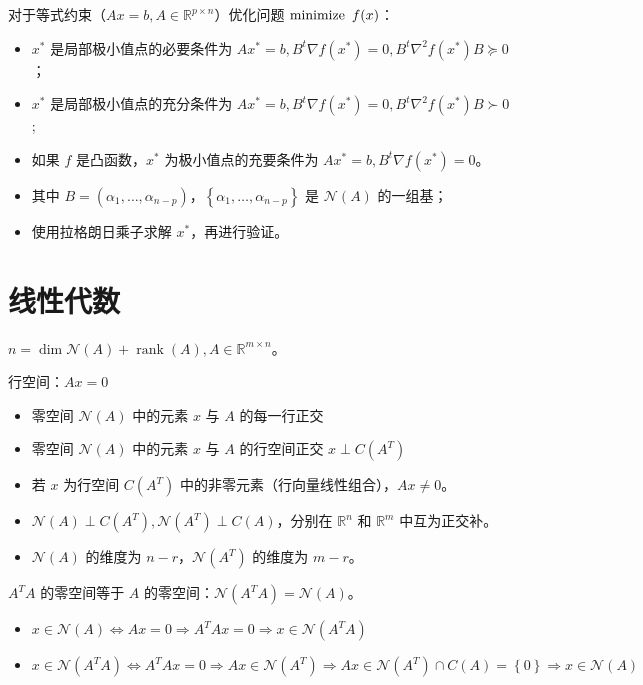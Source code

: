 \begin{remark}
	对于等式约束（$Ax=b, A\in \mathbb{R}^{p\times n}$）优化问题 $\operatorname{minimize}\ f(x)$：
	\begin{itemize}
		\item $x^*$ 是局部极小值点的必要条件为 $Ax^*=b, B^t\nabla f(x^*) = 0, B^t\nabla^2f(x^*)B \succeq 0$；
		\item $x^*$ 是局部极小值点的充分条件为 $Ax^*=b, B^t\nabla f(x^*) = 0, B^t\nabla^2f(x^*)B \succ 0$;
		\item 如果 $f$ 是凸函数，$x^*$ 为极小值点的充要条件为 $Ax^*=b, B^t\nabla f(x^*) = 0$。
		\item 其中 $B=(\alpha_1, \dots, \alpha_{n - p})$，$\left\{\alpha_1, \dots, \alpha_{n - p}\right\}$ 是 $\mathcal{N}(A)$ 的一组基；
		\item 使用拉格朗日乘子求解 $x^*$，再进行验证。
	\end{itemize}
\end{remark}

\section{线性代数}
\begin{remark}
	$n = \dim \mathcal{N}(A) + \operatorname{rank}(A), A\in \mathbb{R}^{m\times n}$。
\end{remark}

\begin{remark}
    行空间：$Ax = 0$
    \begin{itemize}
        \item 零空间 $\mathcal{N}(A)$ 中的元素 $x$ 与 $A$ 的每一行正交
        \item 零空间 $\mathcal{N}(A)$ 中的元素 $x$ 与 $A$ 的行空间正交 $x \perp C(A^T)$
        \item 若 $x$ 为行空间 $C(A^T)$ 中的非零元素（行向量线性组合），$Ax \neq 0$。
        \item $\mathcal{N}(A) \perp C(A^T), \mathcal{N}(A^T) \perp C(A)$，分别在 $\mathbb{R}^n$ 和 $\mathbb{R}^m$ 中互为正交补。
        \item $\mathcal{N}(A)$ 的维度为 $n - r$，$\mathcal{N}(A^T)$ 的维度为 $m - r$。
    \end{itemize}
\end{remark}

\begin{remark}
	$A^TA$ 的零空间等于 $A$ 的零空间：$\mathcal{N}(A^TA) = \mathcal{N}(A)$。
	\begin{itemize}
		\item $x\in\mathcal{N}(A) \Leftrightarrow Ax=0 \Rightarrow A^TAx=0 \Rightarrow x \in \mathcal{N}(A^TA)$
		\item $x \in \mathcal{N}(A^TA)\Leftrightarrow A^TAx = 0 \Rightarrow Ax \in \mathcal{N}(A^T) \Rightarrow Ax \in \mathcal{N}(A^T)\cap C(A)=\left\{0\right\} \Rightarrow x\in \mathcal{N}(A)$
	\end{itemize}
\end{remark}

